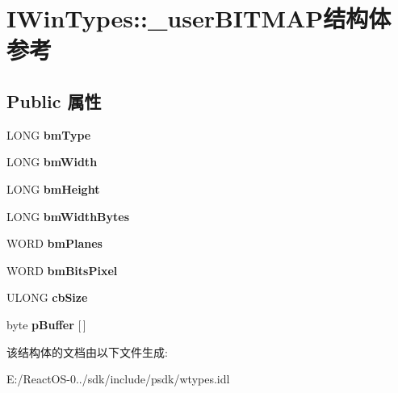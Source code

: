 \hypertarget{struct_i_win_types_1_1__user_b_i_t_m_a_p}{}\section{I\+Win\+Types\+:\+:\+\_\+user\+B\+I\+T\+M\+A\+P结构体 参考}
\label{struct_i_win_types_1_1__user_b_i_t_m_a_p}
\subsection*{Public 属性}
\begin{DoxyCompactItemize}
\item 
\mbox{\label{struct_i_win_types_1_1__user_b_i_t_m_a_p_ac6760e15f1b05f904d910ae26d080d70}} 
L\+O\+NG {\bfseries bm\+Type}
\item 
\mbox{\label{struct_i_win_types_1_1__user_b_i_t_m_a_p_a06faea0f9bcfd027392dd5de34e496a1}} 
L\+O\+NG {\bfseries bm\+Width}
\item 
\mbox{\label{struct_i_win_types_1_1__user_b_i_t_m_a_p_a574ca5fb91e4b45a5172bf7323235b11}} 
L\+O\+NG {\bfseries bm\+Height}
\item 
\mbox{\label{struct_i_win_types_1_1__user_b_i_t_m_a_p_a8afa3d8ff614979f30ec736dfa20abe2}} 
L\+O\+NG {\bfseries bm\+Width\+Bytes}
\item 
\mbox{\label{struct_i_win_types_1_1__user_b_i_t_m_a_p_a9f3198f4eed2f0a4842d76c56a4b11e6}} 
W\+O\+RD {\bfseries bm\+Planes}
\item 
\mbox{\label{struct_i_win_types_1_1__user_b_i_t_m_a_p_ac0b47340c9caa8ef2b0cea8375f42897}} 
W\+O\+RD {\bfseries bm\+Bits\+Pixel}
\item 
\mbox{\label{struct_i_win_types_1_1__user_b_i_t_m_a_p_a0b65de2ce274275d09fa8c2837b94fdc}} 
U\+L\+O\+NG {\bfseries cb\+Size}
\item 
\mbox{\label{struct_i_win_types_1_1__user_b_i_t_m_a_p_aa069f5e76057069d30770a41dec8ccac}} 
byte {\bfseries p\+Buffer} \mbox{[}$\,$\mbox{]}
\end{DoxyCompactItemize}


该结构体的文档由以下文件生成\+:\begin{DoxyCompactItemize}
\item 
E\+:/\+React\+O\+S-\/0../sdk/include/psdk/wtypes.\+idl\end{DoxyCompactItemize}
